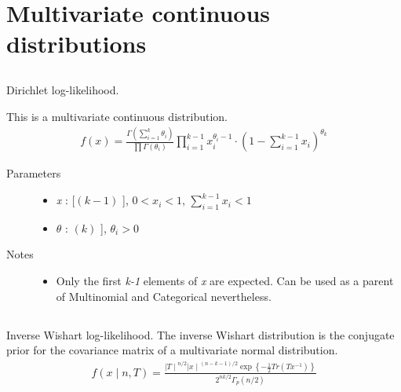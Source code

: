 \documentclass[]{jss}
\begin{document}
\section{Multivariate continuous distributions}
\subsection[Dirichlet]{ }


Dirichlet log-likelihood.

This is a multivariate continuous distribution.
\begin{eqnarray*}
f(x) = \frac{\Gamma(\sum_{i=1}^k \theta_i)}{\prod \Gamma(\theta_i)}\prod_{i=1}^{k-1} x_i^{\theta_i - 1}\cdot\left(1-\sum_{i=1}^{k-1}x_i\right)^{\theta_k}    
\end{eqnarray*}
\begin{description}
\item[Parameters] \leavevmode\begin{itemize}
\item{}
\emph{x} : {[}$(k-1)$ {]}, $0 < x_i < 1$,  $\sum_{i=1}^{k-1} x_i < 1$
\item{}
$\theta$ : \leavevmode{[}$(k)$ {]}, $\theta_i> 0$

\end{itemize}

\item[Notes]\leavevmode \begin{itemize}
    \item {}
    Only the first \emph{k-1} elements of \emph{x} are expected. Can be used as a parent of Multinomial and Categorical
    nevertheless.    
\end{itemize}

\end{description}


\subsection[inverse Wishart]{ }

Inverse Wishart log-likelihood. The inverse Wishart distribution is the conjugate
prior for the covariance matrix of a multivariate normal distribution.
\begin{eqnarray*}
f(x \mid n, T) = \frac{{\mid T \mid}^{n/2}{\mid x \mid}^{(n-k-1)/2} \exp\left\{ -\frac{1}{2} Tr(Tx^{-1}) \right\}}{2^{nk/2} \Gamma_p(n/2)}    
\end{eqnarray*}
\end{document}
